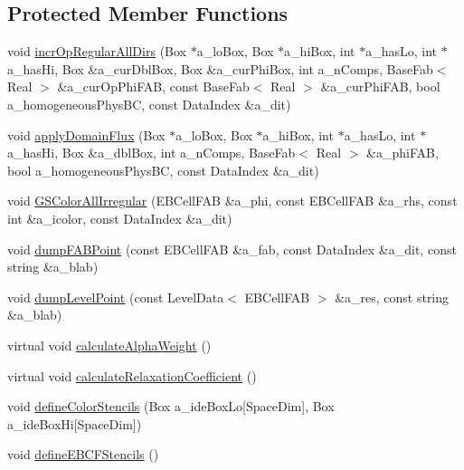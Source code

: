 \subsection*{Protected Member Functions}
\begin{DoxyCompactItemize}
\item 
void \hyperlink{classebconductivityop_a4bcd6d736014faf022a684677aebc4c7}{incr\+Op\+Regular\+All\+Dirs} (Box $\ast$a\+\_\+lo\+Box, Box $\ast$a\+\_\+hi\+Box, int $\ast$a\+\_\+has\+Lo, int $\ast$a\+\_\+has\+Hi, Box \&a\+\_\+cur\+Dbl\+Box, Box \&a\+\_\+cur\+Phi\+Box, int a\+\_\+n\+Comps, Base\+Fab$<$ Real $>$ \&a\+\_\+cur\+Op\+Phi\+F\+AB, const Base\+Fab$<$ Real $>$ \&a\+\_\+cur\+Phi\+F\+AB, bool a\+\_\+homogeneous\+Phys\+BC, const Data\+Index \&a\+\_\+dit)
\item 
void \hyperlink{classebconductivityop_ac1730493d76b93d859bcc16f2de50a66}{apply\+Domain\+Flux} (Box $\ast$a\+\_\+lo\+Box, Box $\ast$a\+\_\+hi\+Box, int $\ast$a\+\_\+has\+Lo, int $\ast$a\+\_\+has\+Hi, Box \&a\+\_\+dbl\+Box, int a\+\_\+n\+Comps, Base\+Fab$<$ Real $>$ \&a\+\_\+phi\+F\+AB, bool a\+\_\+homogeneous\+Phys\+BC, const Data\+Index \&a\+\_\+dit)
\item 
void \hyperlink{classebconductivityop_a60bde85bf54cf141c51b2694d8076db3}{G\+S\+Color\+All\+Irregular} (E\+B\+Cell\+F\+AB \&a\+\_\+phi, const E\+B\+Cell\+F\+AB \&a\+\_\+rhs, const int \&a\+\_\+icolor, const Data\+Index \&a\+\_\+dit)
\item 
void \hyperlink{classebconductivityop_a9dbbcb3facf5838c7844653b0ac0e14b}{dump\+F\+A\+B\+Point} (const E\+B\+Cell\+F\+AB \&a\+\_\+fab, const Data\+Index \&a\+\_\+dit, const string \&a\+\_\+blab)
\item 
void \hyperlink{classebconductivityop_a9cc5036cdfb9826c4ce58020d33a9be3}{dump\+Level\+Point} (const Level\+Data$<$ E\+B\+Cell\+F\+AB $>$ \&a\+\_\+res, const string \&a\+\_\+blab)
\item 
virtual void \hyperlink{classebconductivityop_a3ce04edd626185f33793cbf07c38f9ca}{calculate\+Alpha\+Weight} ()
\item 
virtual void \hyperlink{classebconductivityop_af9524770d405dfd71742be6e7d9c49a1}{calculate\+Relaxation\+Coefficient} ()
\item 
void \hyperlink{classebconductivityop_ab0ad9b71824f0538947d13d747b92cf5}{define\+Color\+Stencils} (Box a\+\_\+ide\+Box\+Lo\mbox{[}Space\+Dim\mbox{]}, Box a\+\_\+ide\+Box\+Hi\mbox{[}Space\+Dim\mbox{]})
\item 
void \hyperlink{classebconductivityop_af71a961c5c74d3d2c80db8c347565a73}{define\+E\+B\+C\+F\+Stencils} ()

\end{DoxyCompactItemize}
